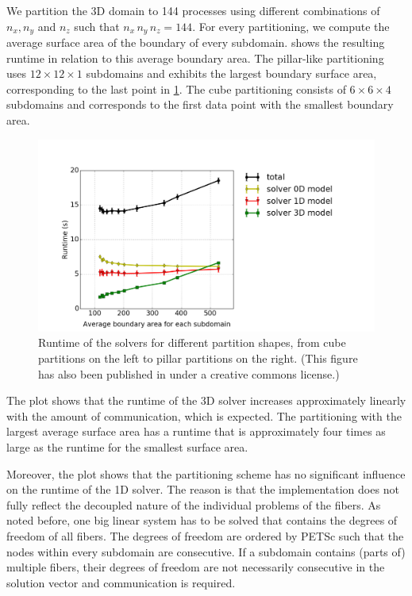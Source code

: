 We partition the 3D domain to 144 processes using different combinations of $n_x,n_y$ and $n_z$ such that $n_x\,n_y\,n_z=144$. 
For every partitioning, we compute the average surface area of the boundary of every subdomain. 
 shows the resulting runtime in relation to this average boundary area.
The pillar-like partitioning uses $12 \times 12 \times 1$ subdomains and exhibits the largest boundary surface area, corresponding to the last point in \cref{fig:opencmiss_partition_shape}. The cube partitioning consists of $6 \times 6 \times 4$ subdomains and corresponds to the first data point with the smallest boundary area.

\begin{figure}
  \centering%
  \includegraphics[width=\textwidth]{images/results/studies/opencmiss_partition_shape.png}%
  \caption{Runtime of the solvers for different partition shapes, from cube partitions on the left to pillar partitions on the right.  \footnotesize(This figure has also been published in \cite{Bradley:2018:EDB} under a creative commons license.)}%
  \label{fig:opencmiss_partition_shape}%
\end{figure}%

The plot shows that the runtime of the 3D solver increases approximately linearly with the amount of communication, which is expected.
The partitioning with the largest average surface area has a runtime that is approximately four times as large as the runtime for the smallest surface area.

Moreover, the plot shows that the partitioning scheme has no significant influence on the runtime of the 1D solver. The reason is that the implementation does not fully reflect the decoupled nature of the individual problems of the fibers. As noted before, one big linear system has to be solved that contains the degrees of freedom of all fibers. The degrees of freedom are ordered by PETSc such that the nodes within every subdomain are consecutive. If a subdomain contains (parts of) multiple fibers, their degrees of freedom are not necessarily consecutive in the solution vector and communication is required.

